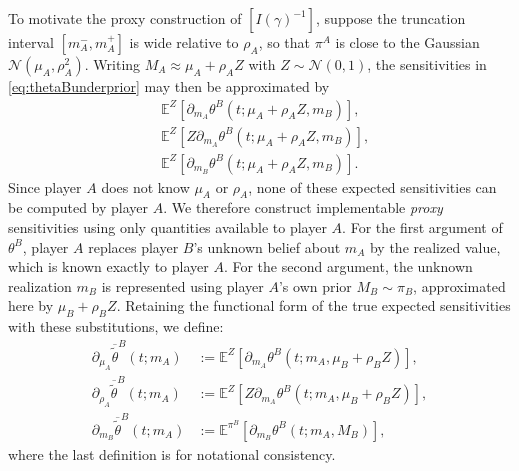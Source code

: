 \documentclass[letterpaper, 10 pt, conference]{ieeeconf}
\newcommand{\E}{\mathbb E}
\begin{document}
To motivate the proxy construction of $[I(\gamma)^{-1}]$, suppose the truncation interval \([m_A^-,m_A^+]\) is wide relative to \(\rho_A\), so that \(\pi^A\) is close to the Gaussian \(\mathcal N(\mu_A,\rho_A^2)\). Writing \(M_A \approx \mu_A+\rho_A Z\) with \(Z\sim\mathcal N(0,1)\), the sensitivities in \eqref{eq:thetaBunderprior} may then be approximated by
 \begin{align*}
    &\E^{Z}\left[\partial_{m_A}\theta^B(t; \mu_A + \rho_A Z, m_B)\right], \\
    &\E^{Z}\left[Z\partial_{m_A}\theta^B(t; \mu_A + \rho_A Z, m_B)\right], \\
    &\E^{Z}\left[\partial_{m_B}\theta^B(t; \mu_A + \rho_A Z, m_B)\right].
 \end{align*} 
Since player $A$ does not know $\mu_A$ or $\rho_A$, none of these expected sensitivities can be computed by player $A$.  We therefore construct implementable \emph{proxy} sensitivities using only quantities available to player $A$. For the first argument of $\theta^B$, player $A$ replaces player $B$'s unknown belief about $m_A$ by the realized value, which is known exactly to player $A$. For the second argument, the unknown realization $m_B$ is represented using player $A$'s own prior $M_B\sim\pi_B$, approximated here by $\mu_B+\rho_B Z$. Retaining the functional form of the true expected sensitivities with these substitutions, we define:
\begin{align*}
    \partial_{\mu_A} \overline{\widetilde{\theta}}^B(t;m_A) &:= \E^{Z}\left[\partial_{m_A}\theta^B(t; m_A, \mu_B + \rho_B Z)\right], \\
    \partial_{\rho_A} \overline{\widetilde{\theta}}^B(t; m_A) &:= \E^{Z}\left[Z\partial_{m_A}\theta^B(t; m_A, \mu_B + \rho_B Z)\right], \\
    \partial_{m_B} \overline{\widetilde{\theta}}^B(t; m_A) &:= \E^{\pi^B}[\partial_{m_B}\theta^B(t; m_A, M_B)],
\end{align*}
where the last definition is for notational consistency.  
\end{document}
